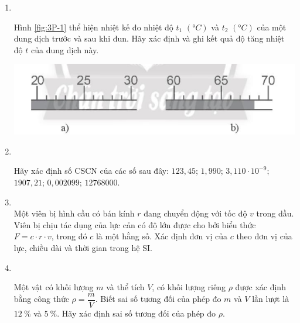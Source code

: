 \begin{enumerate}[label=\bfseries Bài \arabic*:,leftmargin=1.5cm]
\item {}\\
{Hình \ref{fig:3P-1} thể hiện nhiệt kế đo nhiệt độ $t_1$ $\left(\si{\degree C}\right)$ và $t_2$ $\left(\si{\degree C}\right)$ của một dung dịch trước và sau khi đun. Hãy xác định và ghi kết quả độ tăng nhiệt độ $t$ của dung dịch này.
	\begin{center}
		\includegraphics[width=0.4\linewidth]{../figs/VN10-2022-PH-TP003-P-1}
		\label{fig:3P-1}
	\end{center}
}

\item {}\\
{Hãy xác định số CSCN của các số sau đây: $123,45$; $1,990$; $3,110\cdot 10^{-9}$; $1907,21$; $0,002099$; $12768000$. 

}
	
	\item {}\\
	{Một viên bị hình cầu có bán kính $r$ đang chuyển động với tốc độ $v$ trong dầu. Viên bị chịu tác dụng của lực cản có độ lớn được cho bởi biểu thức $F=c\cdot r\cdot v$, trong đó $c$ là một hằng số. Xác định đơn vị của $c$ theo đơn vị của lực, chiều dài và thời gian trong hệ SI.
}
	
	\item {}\\
	{Một vật có khối lượng $m$ và thể tích $V$, có khối lượng riêng $\rho$ được xác định bằng công thức $\rho =\dfrac{m}{V}$. Biết sai số tương đối của phép đo $m$ và $V$ lần lượt là $\SI{12}{\percent}$ và $\SI{5}{\percent}$. Hãy xác định sai số tương đối của phép đo $\rho$.
	
}
\end{enumerate}

